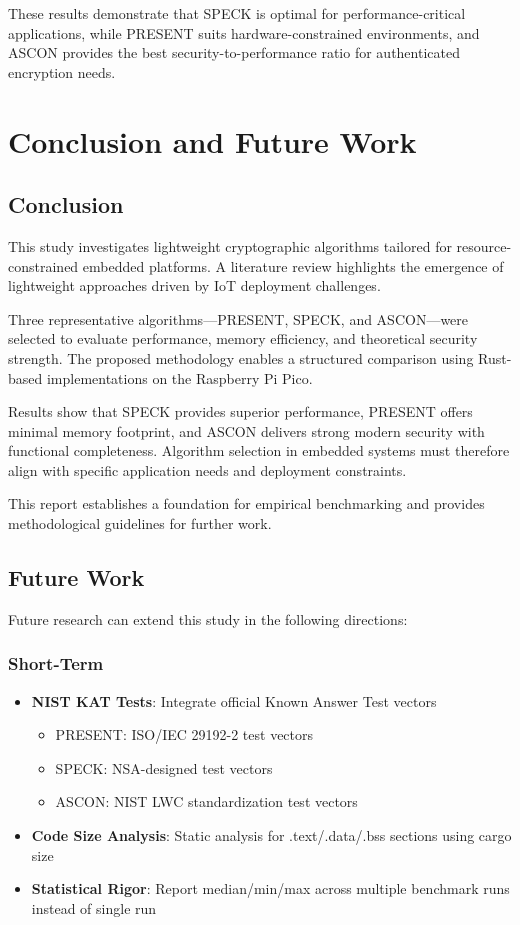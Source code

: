 \documentclass[12pt]{report}
\begin{document}
These results demonstrate that SPECK is optimal for performance-critical applications, while PRESENT suits hardware-constrained environments, and ASCON provides the best security-to-performance ratio for authenticated encryption needs.

\chapter{Conclusion and Future Work}

\section{Conclusion}

This study investigates lightweight cryptographic algorithms tailored for resource-constrained embedded platforms. A literature review highlights the emergence of lightweight approaches driven by IoT deployment challenges.

Three representative algorithms—PRESENT, SPECK, and ASCON—were selected to evaluate performance, memory efficiency, and theoretical security strength. The proposed methodology enables a structured comparison using Rust-based implementations on the Raspberry Pi Pico.

Results show that SPECK provides superior performance, PRESENT offers minimal memory footprint, and ASCON delivers strong modern security with functional completeness. Algorithm selection in embedded systems must therefore align with specific application needs and deployment constraints.

This report establishes a foundation for empirical benchmarking and provides methodological guidelines for further work.

\section{Future Work}

Future research can extend this study in the following directions:

\subsection{Short-Term}

\begin{itemize}
    \item \textbf{NIST KAT Tests}: Integrate official Known Answer Test vectors
    \begin{itemize}
        \item PRESENT: ISO/IEC 29192-2 test vectors
        \item SPECK: NSA-designed test vectors
        \item ASCON: NIST LWC standardization test vectors
    \end{itemize}
    \item \textbf{Code Size Analysis}: Static analysis for .text/.data/.bss sections using cargo size
    \item \textbf{Statistical Rigor}: Report median/min/max across multiple benchmark runs instead of single run
\end{itemize}
\end{document}
